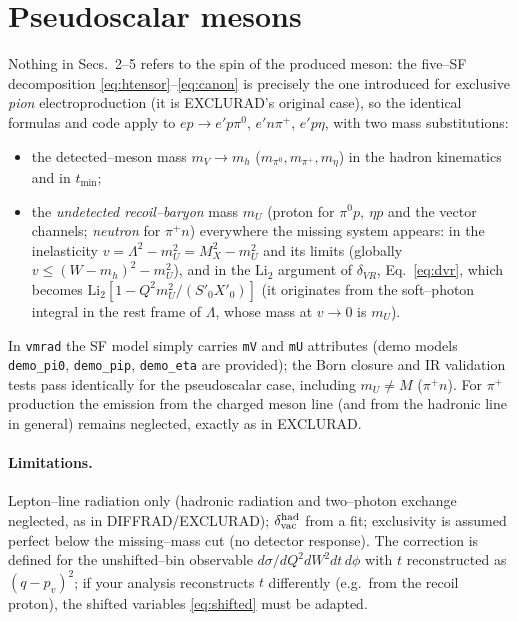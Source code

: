 \documentclass[11pt]{article}
\newcommand{\Li}{\mathrm{Li}_2}
\begin{document}
\section{Pseudoscalar mesons}

Nothing in Secs.~2--5 refers to the spin of the produced meson: the
five--SF decomposition \eqref{eq:htensor}--\eqref{eq:canon} is precisely the
one introduced for exclusive \emph{pion} electroproduction (it is
EXCLURAD's original case), so the identical formulas and code apply to
$ep\to e'p\pi^0$, $e'n\pi^+$, $e'p\eta$, with two mass substitutions:
\begin{itemize}
\item the detected--meson mass $m_V\to m_h$ ($m_{\pi^0},m_{\pi^+},m_\eta$)
in the hadron kinematics and in $t_{\min}$;
\item the \emph{undetected recoil--baryon} mass $m_U$ (proton for
$\pi^0 p,\ \eta p$ and the vector channels; \emph{neutron} for $\pi^+n$)
everywhere the missing system appears: in the inelasticity
$v=\Lambda^2-m_U^2=M_X^2-m_U^2$ and its limits
(globally $v\le (W-m_h)^2-m_U^2$), and in the $\Li$ argument of
$\delta_{VR}$, Eq.~\eqref{eq:dvr}, which becomes
$\Li[1-Q^2m_U^2/(S'_0X'_0)]$ (it originates from the soft--photon integral
in the rest frame of $\Lambda$, whose mass at $v\to0$ is $m_U$).
\end{itemize}
In \texttt{vmrad} the SF model simply carries \texttt{mV} and \texttt{mU}
attributes (demo models \texttt{demo\_pi0}, \texttt{demo\_pip},
\texttt{demo\_eta} are provided); the Born closure and IR validation tests
pass identically for the pseudoscalar case, including $m_U\ne M$
($\pi^+n$). For $\pi^+$ production the emission from the charged meson
line (and from the hadronic line in general) remains neglected, exactly as
in EXCLURAD.

\paragraph{Limitations.} Lepton--line radiation only (hadronic radiation
and two--photon exchange neglected, as in DIFFRAD/EXCLURAD);
$\delta^{\rm had}_{\rm vac}$ from a fit; exclusivity is assumed perfect
below the missing--mass cut (no detector response). The correction is
defined for the unshifted--bin observable
$d\sigma/dQ^2dW^2dt\,d\phi$ with $t$ reconstructed as $(q-p_v)^2$; if your
analysis reconstructs $t$ differently (e.g.\ from the recoil proton), the
shifted variables \eqref{eq:shifted} must be adapted.
\end{document}
